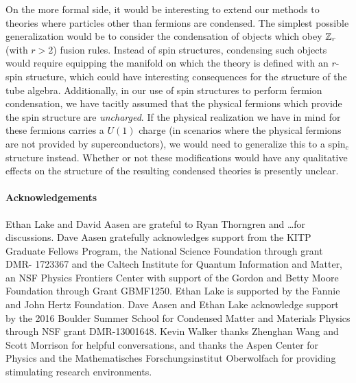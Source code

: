 
On the more formal side, it would be interesting to extend our methods to theories where particles other than fermions are condensed. 
The simplest possible generalization would be to consider the condensation of objects which obey $\mathbb{Z}_r$ (with $r>2$) 
fusion rules. 
Instead of spin structures, condensing such objects would require equipping the manifold on which the theory is defined with an $r$-spin structure, 
which could have interesting consequences for the structure of the 
tube algebra.  
Additionally, in our use of spin structures %
to perform fermion condensation, we have tacitly assumed that the physical fermions which provide the spin structure are {\it uncharged}. 
If the physical realization we have in mind for these fermions carries a $U(1)$ charge (in scenarios where 
the physical fermions are not provided by superconductors), we would need to generalize this to a spin$_c$ structure instead. 
Whether or not these modifications would have any qualitative effects on the structure of the resulting condensed theories 
is presently unclear.  


 
 \paragraph{Acknowledgements}
Ethan Lake and David Aasen are grateful to Ryan Thorngren and \dots for discussions. Dave Aasen gratefully acknowledges support from the KITP Graduate Fellows Program, the National Science Foundation through grant DMR- 1723367
and the Caltech Institute for Quantum Information and Matter, 
an NSF Physics Frontiers Center with support of the Gordon and Betty Moore Foundation through Grant GBMF1250.
Ethan Lake is supported by the Fannie and John Hertz Foundation.
Dave Aasen and Ethan Lake acknowledge support by the 2016 Boulder Summer School for Condensed
Matter and Materials Physics through NSF grant DMR-13001648.
Kevin Walker thanks Zhenghan Wang and Scott Morrison for helpful conversations, and
thanks the Aspen Center for Physics and  the Mathematisches Forschungsinstitut Oberwolfach
for providing stimulating research environments.

